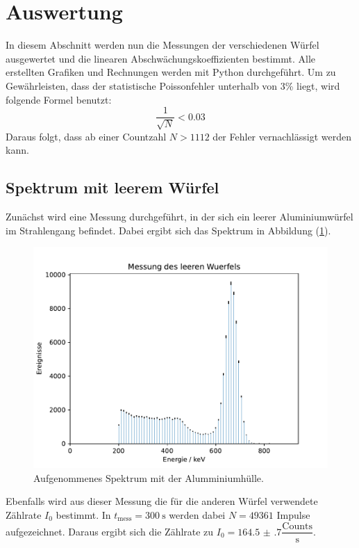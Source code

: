 \section{Auswertung}
\label{sec:Auswertung}
In diesem Abschnitt werden nun die Messungen der verschiedenen Würfel ausgewertet und die linearen Abschwächungskoeffizienten bestimmt.
Alle erstellten Grafiken und Rechnungen werden mit Python \cite{python} durchgeführt. Um zu Gewährleisten, dass der statistische Poissonfehler unterhalb von 3\% liegt, wird folgende Formel benutzt:
\begin{equation}
  \dfrac{1}{\sqrt{N}} < \num{0,03}
\end{equation}
Daraus folgt, dass ab einer Countzahl $N>1112$ der Fehler vernachlässigt werden kann.
\subsection{Spektrum mit leerem Würfel}
Zunächst wird eine Messung durchgeführt, in der sich ein leerer Aluminiumwürfel im Strahlengang befindet. Dabei ergibt sich das Spektrum in Abbildung (\ref{fig:alu_leer}).
\begin{figure}
	\centering
	\includegraphics[scale=0.7]{fig/Alu_leer.pdf}
	\caption{Aufgenommenes Spektrum mit der Alumminiumhülle.}
	\label{fig:alu_leer}
\end{figure}
\FloatBarrier
\noindent Ebenfalls wird aus dieser Messung die für die anderen Würfel verwendete Zählrate $I_\mathrm{0}$ bestimmt. In $t_\mathrm{mess}=\SI{300}{\second}$ werden dabei $N=49361$ Impulse aufgezeichnet. Daraus ergibt sich die Zählrate zu $I_\mathrm{0}=\num{164.5(7)}\dfrac{\mathrm{Counts}}{\si{\second}}$.

